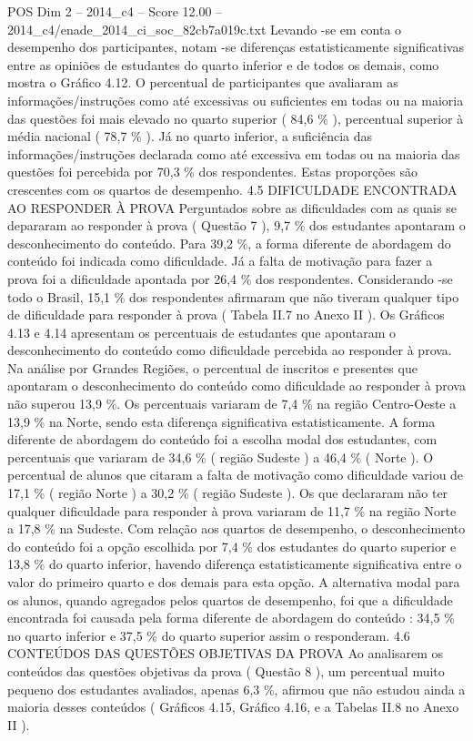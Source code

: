 \begin{textsample}{POS Dim 2 – 2014\_c4 – Score 12.00 – 2014\_c4/enade\_2014\_ci\_soc\_82cb7a019c.txt}
Levando -se em conta o desempenho dos participantes, notam -se diferenças estatisticamente significativas entre as opiniões de estudantes do quarto inferior e de todos os demais, como mostra o Gráfico 4.12.
O percentual de participantes que avaliaram as informações/instruções como até excessivas ou suficientes em todas ou na maioria das questões foi mais elevado no quarto superior ( 84,6 \% ), percentual superior à média nacional ( 78,7 \% ).
Já no quarto inferior, a suficiência das informações/instruções declarada como até excessiva em todas ou na maioria das questões foi percebida por 70,3 \% dos respondentes.
Estas proporções são crescentes com os quartos de desempenho. 4.5 DIFICULDADE ENCONTRADA AO RESPONDER À PROVA Perguntados sobre as dificuldades com as quais se depararam ao responder à prova ( Questão 7 ), 9,7 \% dos estudantes apontaram o desconhecimento do conteúdo.
Para 39,2 \%, a forma diferente de abordagem do conteúdo foi indicada como dificuldade.
Já a falta de motivação para fazer a prova foi a dificuldade apontada por 26,4 \% dos respondentes.
Considerando -se todo o Brasil, 15,1 \% dos respondentes afirmaram que não tiveram qualquer tipo de dificuldade para responder à prova ( Tabela II.7 no Anexo II ).
Os Gráficos 4.13 e 4.14 apresentam os percentuais de estudantes que apontaram o desconhecimento do conteúdo como dificuldade percebida ao responder à prova.
Na análise por Grandes Regiões, o percentual de inscritos e presentes que apontaram o desconhecimento do conteúdo como dificuldade ao responder à prova não superou 13,9 \%.
Os percentuais variaram de 7,4 \% na região Centro-Oeste a 13,9 \% na Norte, sendo esta diferença significativa estatisticamente.
A forma diferente de abordagem do conteúdo foi a escolha modal dos estudantes, com percentuais que variaram de 34,6 \% ( região Sudeste ) a 46,4 \% ( Norte ).
O percentual de alunos que citaram a falta de motivação como dificuldade variou de 17,1 \% ( região Norte ) a 30,2 \% ( região Sudeste ).
Os que declararam não ter qualquer dificuldade para responder à prova variaram de 11,7 \% na região Norte a 17,8 \% na Sudeste.
Com relação aos quartos de desempenho, o desconhecimento do conteúdo foi a opção escolhida por 7,4 \% dos estudantes do quarto superior e 13,8 \% do quarto inferior, havendo diferença estatisticamente significativa entre o valor do primeiro quarto e dos demais para esta opção.
A alternativa modal para os alunos, quando agregados pelos quartos de desempenho, foi que a dificuldade encontrada foi causada pela forma diferente de abordagem do conteúdo : 34,5 \% no quarto inferior e 37,5 \% do quarto superior assim o responderam. 4.6 CONTEÚDOS DAS QUESTÕES OBJETIVAS DA PROVA Ao analisarem os conteúdos das questões objetivas da prova ( Questão 8 ), um percentual muito pequeno dos estudantes avaliados, apenas 6,3 \%, afirmou que não estudou ainda a maioria desses conteúdos ( Gráficos 4.15, Gráfico 4.16, e a Tabelas II.8 no Anexo II ).

\end{textsample}
